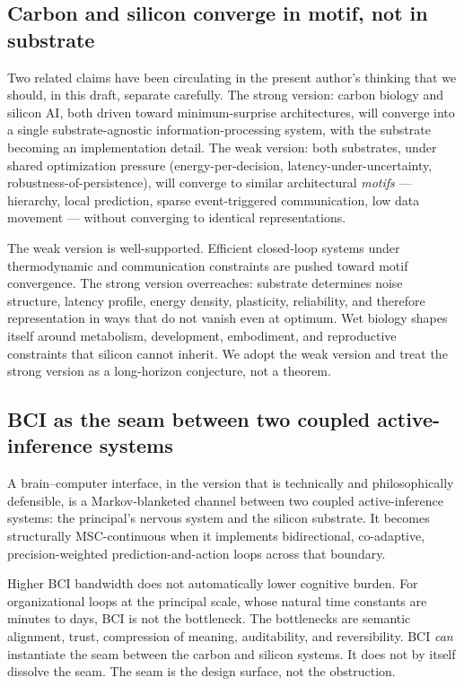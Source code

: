 \documentclass[11pt]{article}
\begin{document}
\subsection{Carbon and silicon converge in motif, not in substrate}

Two related claims have been circulating in the present author's thinking that we should, in this draft, separate carefully. The strong version: carbon biology and silicon AI, both driven toward minimum-surprise architectures, will converge into a single substrate-agnostic information-processing system, with the substrate becoming an implementation detail. The weak version: both substrates, under shared optimization pressure (energy-per-decision, latency-under-uncertainty, robustness-of-persistence), will converge to similar architectural \emph{motifs} --- hierarchy, local prediction, sparse event-triggered communication, low data movement --- without converging to identical representations.

The weak version is well-supported. Efficient closed-loop systems under thermodynamic and communication constraints are pushed toward motif convergence. The strong version overreaches: substrate determines noise structure, latency profile, energy density, plasticity, reliability, and therefore representation in ways that do not vanish even at optimum. Wet biology shapes itself around metabolism, development, embodiment, and reproductive constraints that silicon cannot inherit. We adopt the weak version and treat the strong version as a long-horizon conjecture, not a theorem.

\subsection{BCI as the seam between two coupled active-inference systems}

A brain--computer interface, in the version that is technically and philosophically defensible, is a Markov-blanketed channel between two coupled active-inference systems: the principal's nervous system and the silicon substrate. It becomes structurally MSC-continuous when it implements bidirectional, co-adaptive, precision-weighted prediction-and-action loops across that boundary.

Higher BCI bandwidth does not automatically lower cognitive burden. For organizational loops at the principal scale, whose natural time constants are minutes to days, BCI is not the bottleneck. The bottlenecks are semantic alignment, trust, compression of meaning, auditability, and reversibility. BCI \emph{can} instantiate the seam between the carbon and silicon systems. It does not by itself dissolve the seam. The seam is the design surface, not the obstruction.
\end{document}
